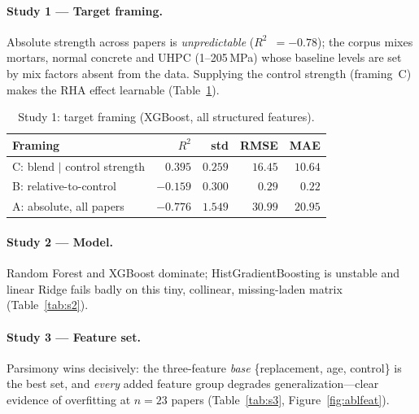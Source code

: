 \documentclass[11pt]{article}
\newcommand{\R}{$R^2$}
\begin{document}
\paragraph{Study 1 --- Target framing.}
Absolute strength across papers is \emph{unpredictable} (\R{}~$=-0.78$); the corpus
mixes mortars, normal concrete and UHPC (1--205\,MPa) whose baseline levels are set by
mix factors absent from the data. Supplying the control strength (framing~C) makes the
RHA effect learnable (Table~\ref{tab:s1}).

\begin{table}[H]\centering\small
\caption{Study 1: target framing (XGBoost, all structured features).}
\label{tab:s1}
\begin{tabular}{lrrrr}
\toprule
Framing & \R{} & std & RMSE & MAE \\
\midrule
\rowcolor{green!12}C: blend $\mid$ control strength & $0.395$ & $0.259$ & $16.45$ & $10.64$ \\
B: relative-to-control & $-0.159$ & $0.300$ & $0.29$ & $0.22$ \\
A: absolute, all papers & $-0.776$ & $1.549$ & $30.99$ & $20.95$ \\
\bottomrule
\end{tabular}
\end{table}

\paragraph{Study 2 --- Model.}
Random Forest and XGBoost dominate; HistGradientBoosting is unstable and linear
Ridge fails badly on this tiny, collinear, missing-laden matrix
(Table~\ref{tab:s2}).

\paragraph{Study 3 --- Feature set.}
Parsimony wins decisively: the three-feature \emph{base}
\{replacement, age, control\} is the best set, and \emph{every} added feature group
degrades generalization---clear evidence of overfitting at $n\!=\!23$ papers
(Table~\ref{tab:s3}, Figure~\ref{fig:ablfeat}).
\end{document}
